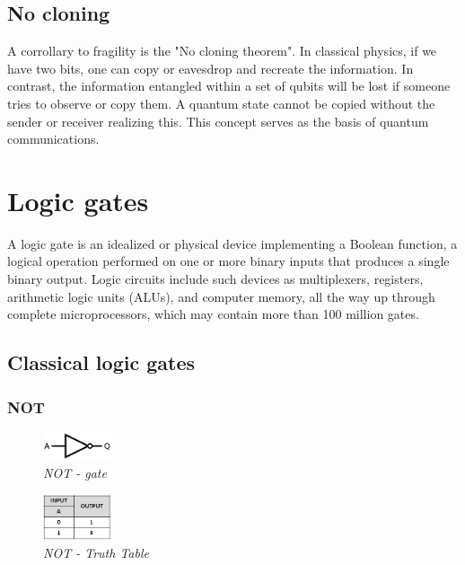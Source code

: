 \documentclass{article}
\begin{document}
\subsection{No cloning}
A corrollary to fragility is the "No cloning theorem". In classical physics, if we have two bits, one can copy or eavesdrop and recreate the information. In contrast, the information entangled within a set of qubits will be lost if someone tries to observe or copy them. A quantum state cannot be copied without the sender or receiver realizing this. This concept serves as the basis of quantum communications.
\newpage
\section{Logic gates}
A logic gate is an idealized or physical device implementing a Boolean function, a logical operation performed on one or more binary inputs that produces a single binary output. 
Logic circuits include such devices as multiplexers, registers, arithmetic logic units (ALUs), and computer memory, all the way up through complete microprocessors, which may contain more than 100 million gates.
\subsection{Classical logic gates}
\subsubsection{NOT}
\begin{figure}[h]
\begin{center}
\begin{minipage}[b]{4cm}
\centering
\includegraphics[width=2cm]{not_gate.png}\\\textit{NOT - gate}
\end{minipage}
\begin{minipage}[b]{2cm}
\centering
\includegraphics[width=2cm]{not_truthtable.png}\\\textit{NOT - Truth Table}
\end{minipage}
\end{center}
\end{figure}
\end{document}
